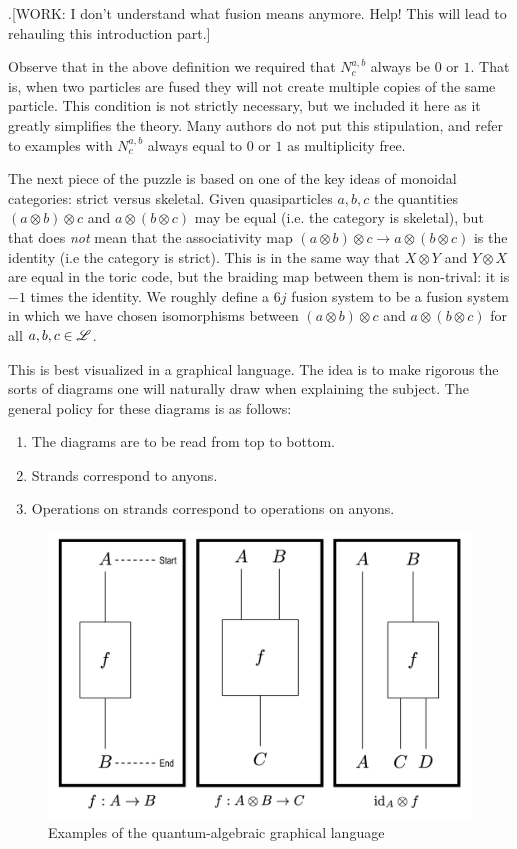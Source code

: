 \documentclass{article}
\theoremstyle{definition}
\numberwithin{figure}{section}
\begin{document}
.[WORK: I don't understand what fusion means anymore. Help! This will lead to rehauling this introduction part.]

Observe that in the above definition we required that $N_c^{a,b}$ always be $0$ or $1$. That is, when two particles are fused they will not create multiple copies of the same particle. This condition is not strictly necessary, but we included it here as it greatly simplifies the theory. Many authors do not put this stipulation, and refer to examples with $N_c^{a,b}$ always equal to $0$ or $1$ as multiplicity free. 

The next piece of the puzzle is based on one of the key ideas of monoidal categories: strict versus skeletal. Given quasiparticles $a,b,c$ the quantities $(a\otimes b)\otimes c$ and $a\otimes (b\otimes c)$ may be equal (i.e. the category is skeletal), but that does \textit{not} mean that the associativity map $(a\otimes b)\otimes c\to a\otimes (b\otimes c)$ is the identity (i.e the category is strict). This is in the same way that $X\otimes Y$ and $Y\otimes X$ are equal in the toric code, but the braiding map between them is non-trival: it is $-1$ times the identity. We roughly define a $6j$ fusion system to be a fusion system in which we have chosen isomorphisms between $(a\otimes b)\otimes c$ and $a\otimes (b\otimes c)$ for all $a,b,c\in \mathscr{L}$.

This is best visualized in a graphical language. The idea is to make rigorous the sorts of diagrams one will naturally draw when explaining the subject. The general policy for these diagrams is as follows:

\begin{enumerate}
\item The diagrams are to be read from top to bottom.
\item Strands correspond to anyons.
\item Operations on strands correspond to operations on anyons.
\end{enumerate}

\begin{figure}
\begin{center}
\includegraphics[scale=0.2]{graphical-language}
\caption{Examples of the quantum-algebraic graphical language}
\label{fig:graphical-language}
\end{center}
\end{figure}
\end{document}
